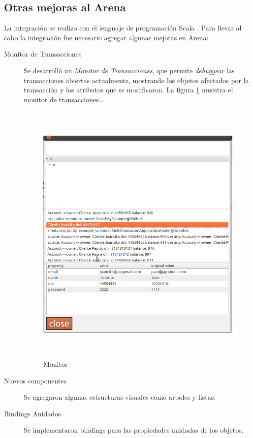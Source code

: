 \subsection{Otras mejoras al Arena}
	La integración se realizo con el lenguaje de programación Scala
	\cite{???}. Para llevar al cabo la integración fue necesario agregar algunas
	mejoras en Arena:
	\begin{description}
	  \item[Monitor de Transacciones]
		 Se desarrolló un \emph{Monitor de Transacciones}, que permite
		 \emph{debuggear} las transacciones abiertas actualmente, mostrando
		 los objetos afectados por la transacción y los atributos que se
		 modificaron.
		La figura \ref{monitor} muestra el monitor de transacciones\ldots
		
		\begin{figure}[h]
			\centering
			\includegraphics[width=450px, height=500px]{img/monitorTransacciones.png}
			\caption{Monitor}
			\label{monitor}
		\end{figure}	
	
	  \item[Nuevos componentes] Se agregaron algunas estructuras visuales como
	  arboles y listas.
	  \item[Bindings Anidados] Se implementaron bindings para las propiedades
	  anidadas de los objetos.
	\end{description}
